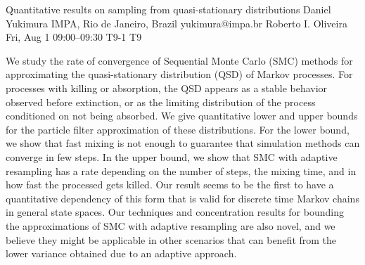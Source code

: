 \documentclass[12pt,lettersize,oneside]{book} %
\begin{document}
\begin{talk}
  {Quantitative results on sampling from quasi-stationary distributions}%
  {Daniel Yukimura}%
  {IMPA, Rio de Janeiro, Brazil}%
  {yukimura@impa.br}%
  {Roberto I. Oliveira}%
  {}%
  {Fri, Aug 1 09:00--09:30}%
  {T9-1}%
  {T9}%
  
    
   
    We study the rate of convergence of Sequential Monte Carlo (SMC) methods for approximating the quasi-stationary distribution (QSD) of Markov processes. 
    For processes with killing or absorption, the QSD appears as a stable behavior observed before extinction, or as the limiting distribution of the process conditioned on not being absorbed. 
    We give quantitative lower and upper bounds for the particle filter approximation of these distributions.
    For the lower bound, we show that fast mixing is not enough to guarantee that simulation methods can converge in few steps.
    In the upper bound, we show that SMC with adaptive resampling has a rate depending on the number of steps, the mixing time, and in how fast the processed gets killed.
    Our result seems to be the first to have a quantitative dependency of this form that is valid for discrete time Markov chains in general state spaces.
    Our techniques and concentration results for bounding the approximations of SMC with adaptive resampling are also novel, and we believe they might be applicable in other scenarios that can benefit from the lower variance obtained due to an adaptive approach.
    
    

\medskip


\end{talk}
\end{document}
